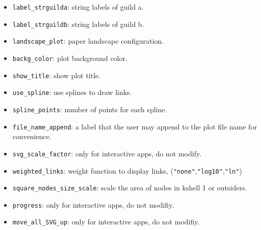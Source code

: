 \documentclass[11pt]{article}
\begin{document}
\begin{itemize}
\item \texttt{label\_strguilda}: string labels of guild a.

\item \texttt{label\_strguildb}: string labels of guild b.

\item \texttt{landscape\_plot}: paper landscape configuration.

\item \texttt{backg\_color}: plot background color.

\item \texttt{show\_title}: show plot title.

\item \texttt{use\_spline}: use splines to draw links.

\item \texttt{spline\_points}: number of points for each spline.

\item \texttt{file\_name\_append}: a label that the user may append to the plot file name for convenience.

\item \texttt{svg\_scale\_factor}: only for interactive apps, do not modify.

\item \texttt{weighted\_links}: weight function to display links, (\texttt{"none"},\texttt{"log10"},\texttt{"ln"})

\item \texttt{square\_nodes\_size\_scale}: scale the area of nodes in kshell 1 or outsiders.

\item \texttt{progress}: only for interactive apps, do not modifiy.

\item \texttt{move\_all\_SVG\_up}: only for interactive apps, do not modifiy.

\end{itemize}


\normalsize

\clearpage
\printbibliography[heading=bibintoc]
\end{document}
